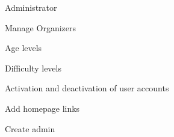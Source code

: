 
\begin{section}{Administrator}

    \begin{subsection}{Manage Organizers}
    
    
		
    
    \end{subsection}
    
    \begin{subsection}{Age levels}
    
    
    \end{subsection}
    
    \begin{subsection}{Difficulty levels}
    
    
    \end{subsection}
    
    \begin{subsection}{Activation and deactivation of user accounts}
    
    \end{subsection}
    
    \begin{subsection}{Add homepage links}
    
    \end{subsection}
		
		\begin{subsection}{Create admin}
		
		\end{subsection}

\end{section}

